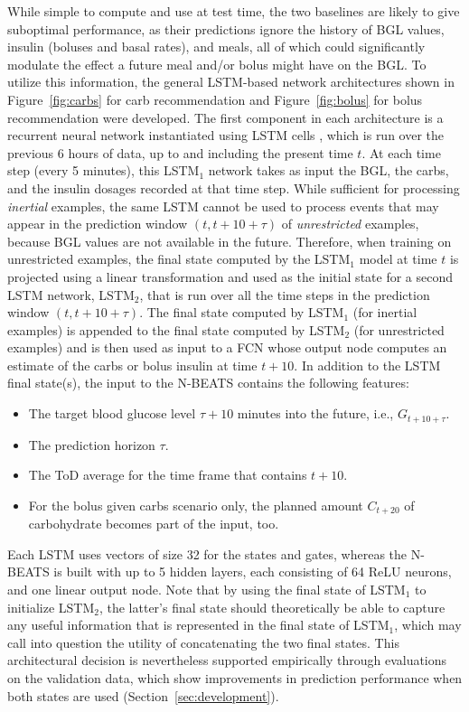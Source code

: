 While simple to compute and use at test time, the two baselines are likely to give suboptimal performance, as their predictions ignore the history of \ac{BGL} values, insulin (boluses and basal rates), and meals, all of which could significantly modulate the effect a future meal and/or bolus might have on the \ac{BGL}. To utilize this information, the general \ac{LSTM}-based network architectures shown in Figure~\ref{fig:carbs} for carb recommendation and Figure~\ref{fig:bolus} for bolus recommendation were developed. The first component in each architecture is a recurrent neural network instantiated using \ac{LSTM} cells \cite{hochreiter:nc97}, which is run over the previous 6 hours of data, up to and including the present time $t$. At each time step (every 5 minutes), this LSTM$_1$ network takes as input the \ac{BGL}, the carbs, and the insulin dosages recorded at that time step. While sufficient for processing {\it inertial} examples, the same \ac{LSTM} cannot be used to process events that may appear in the prediction window $(t, t+10+\tau)$ of {\it unrestricted} examples, because \ac{BGL} values are not available in the future. Therefore, when training on unrestricted examples, the final state computed by the LSTM$_1$ model at time $t$ is projected using a linear transformation and used as the initial state for a second \ac{LSTM} network, LSTM$_2$, that is run over all the time steps in the prediction window $(t, t+10+\tau)$. The final state computed by LSTM$_1$ (for inertial examples) is appended to the final state computed by LSTM$_2$ (for unrestricted examples) and is then used as input to a \ac{FCN} whose output node computes an estimate of the carbs or bolus insulin at time $t+10$. In addition to the \ac{LSTM} final state(s), the input to the \ac{N-BEATS} contains the following features:
\begin{itemize}
    \item The target blood glucose level $\tau+10$ minutes into the future, i.e., $G_{t + 10 + \tau}$.
    \item The prediction horizon $\tau$.
    \item The \ac{ToD} average for the time frame that contains $t+10$.
    \item For the bolus given carbs scenario only, the planned amount $C_{t + 20}$ of carbohydrate becomes part of the input, too.
\end{itemize}
Each \ac{LSTM} uses vectors of size 32 for the states and gates, whereas the \ac{N-BEATS} is built with up to 5 hidden layers, each consisting of 64 ReLU neurons, and one linear output node. Note that by using the final state of LSTM$_1$  to initialize LSTM$_2$, the latter's final state should theoretically be able to capture any useful information that is represented in the final state of LSTM$_1$, which may call into question the utility of concatenating the two final states. This architectural decision is nevertheless supported empirically through evaluations on the validation data, which show improvements in prediction performance when both states are used (Section~\ref{sec:development}).

